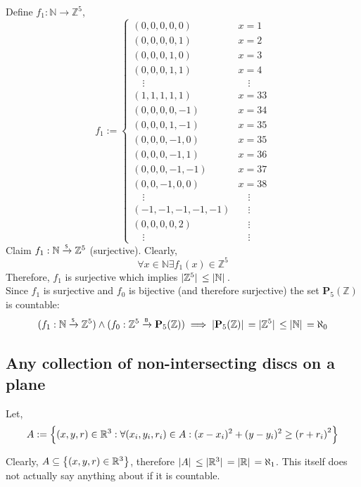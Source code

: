 \documentclass[]{article}
\newcommand{\R}{\mathbb{R}}
\newcommand{\N}{\mathbb{N}}
\newcommand{\Z}{\mathbb{Z}}
\newcommand{\toS}{\xrightarrow{\textsf{\tiny S}}}
\newcommand{\toB}{\xrightarrow{\textsf{\tiny B}}}
\begin{document}
Define $f_1 : \N \to \Z^5$,
\begin{displaymath}
	f_1 := 
	\begin{cases}
		(0,0,0,0,0)	&x=1\\
		(0,0,0,0,1)	&x=2\\
		(0,0,0,1,0)	&x=3\\
		(0,0,0,1,1)	&x=4\\
		\quad \vdots &\quad \vdots\\
		(1,1,1,1,1) &x=33\\
		(0,0,0,0,-1)&x=34\\
		(0,0,0,1,-1)&x=35\\
		(0,0,0,-1,0)&x=35\\
		(0,0,0,-1,1)&x=36\\
		(0,0,0,-1,-1)&x=37\\
		(0,0,-1,0,0)&x=38\\
		\quad \vdots &\quad \vdots\\
		(-1,-1,-1,-1,-1) &\quad \vdots\\
		(0,0,0,0,2) &\quad \vdots\\
		\quad \vdots &\quad \vdots
	\end{cases}
\end{displaymath}
Claim $f_1 : \N \toS \Z^5$ (surjective).
Clearly,
\begin{displaymath}
	\forall x \in \N \exists f_1(x) \in \Z^5
\end{displaymath}
Therefore, $f_1$ is surjective which implies $\abs*{\Z^5} \leq \abs*{\N}$.\\

Since $f_1$ is surjective and $f_0$ is bijective (and therefore surjective) the 
set $\mathbf{P}_5(\Z)$ is countable:
\begin{displaymath}
	(f_1 : \N \toS \Z^5) \land (f_0 : \Z^5 \toB \mathbf{P}_5(\Z))
	\implies \abs*{\mathbf{P}_5(\Z)} = \abs*{\Z^5} \leq \abs*{\N} = \aleph_0
\end{displaymath}

\newpage
\subsection{Any collection of non-intersecting discs on a plane}
Let,
\begin{displaymath}
	A := \qty{(x,y,r) \in \R^3 : \forall (x_i,y_i,r_i) \in A : 
			(x - x_i)^2 + (y - y_i)^2 \geq \qty(r + r_i)^2}
\end{displaymath}

Clearly, $A \subseteq \qty{(x,y,r) \in \R^3}$, therefore 
$\abs*{A} \leq \abs*{\R^3} = \abs*{\R}= \aleph_1$.
This itself does not actually say anything about if it is countable.\\
\end{document}
